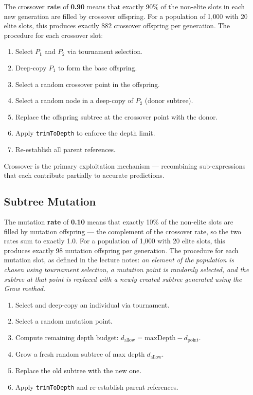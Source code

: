 \documentclass[12pt,a4paper]{article}
\begin{document}
The crossover \textbf{rate} of \textbf{0.90} means that exactly 90\% of the non-elite slots in each new generation are filled by crossover offspring. For a population of 1,000 with 20 elite slots, this produces exactly 882 crossover offspring per generation. The procedure for each crossover slot:

\begin{enumerate}
    \item Select $P_1$ and $P_2$ via tournament selection.
    \item Deep-copy $P_1$ to form the base offspring.
    \item Select a random crossover point in the offspring.
    \item Select a random node in a deep-copy of $P_2$ (donor subtree).
    \item Replace the offspring subtree at the crossover point with the donor.
    \item Apply \texttt{trimToDepth} to enforce the depth limit.
    \item Re-establish all parent references.
\end{enumerate}

Crossover is the primary exploitation mechanism --- recombining sub-expressions that each contribute partially to accurate predictions.

\subsection{Subtree Mutation}

The mutation \textbf{rate} of \textbf{0.10} means that exactly 10\% of the non-elite slots are filled by mutation offspring --- the complement of the crossover rate, so the two rates sum to exactly 1.0. For a population of 1,000 with 20 elite slots, this produces exactly 98 mutation offspring per generation. The procedure for each mutation slot, as defined in the lecture notes: \emph{an element of the population is chosen using tournament selection, a mutation point is randomly selected, and the subtree at that point is replaced with a newly created subtree generated using the Grow method.}

\begin{enumerate}
    \item Select and deep-copy an individual via tournament.
    \item Select a random mutation point.
    \item Compute remaining depth budget: $d_{\text{allow}} = \text{maxDepth} - d_{\text{point}}$.
    \item Grow a fresh random subtree of max depth $d_{\text{allow}}$.
    \item Replace the old subtree with the new one.
    \item Apply \texttt{trimToDepth} and re-establish parent references.
\end{enumerate}
\end{document}
